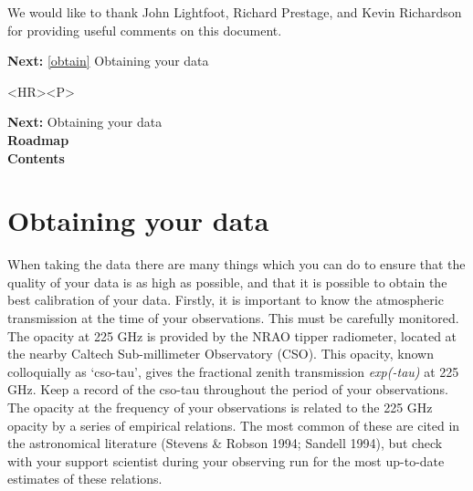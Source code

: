 \documentclass[11pt]{article}
\newenvironment{latexonly}{}{}
\newcommand{\htmlref}[2]{#1}
\newcommand{\xlabel}[1]{}
\begin{document}
   We would like to thank John Lightfoot, Richard Prestage, and Kevin
   Richardson for providing useful comments on this document.

\begin{latexonly}
{\bf Next:} \ref{obtain} Obtaining your data\\
\end{latexonly}

\begin{htmlonly}
\begin{rawhtml} <HR><P> \end{rawhtml}
{\bf \htmlref{Next:}{obtain}} Obtaining your data\\
{\bf \htmlref{Roadmap}{roadmap}}\\
{\bf \htmlref{Contents}{stardoccontents}}\\
\end{htmlonly}


\section{\label{obtain}\xlabel{obtain}Obtaining your data}

   When taking the data there are many things which you can do to ensure
   that the quality of your data is as high as possible, and that it is
   possible to obtain the best calibration of your data. Firstly, it is
   important to know the atmospheric transmission at the time of your
   observations. This must be carefully monitored. The opacity at
   225 GHz is provided by the NRAO tipper radiometer, located at the
   nearby Caltech Sub-millimeter Observatory (CSO). This opacity, known
   colloquially as `cso-tau',
   gives the fractional zenith transmission {\it exp(-tau)\/} at 225 GHz.
   Keep a record of the cso-tau throughout the period of your
   observations. The opacity at the frequency of your observations is
   related to the 225 GHz opacity by a series of empirical relations.
   The most common of these are cited in the astronomical literature
\htmlref{(Stevens \& Robson 1994;}{refer}
\htmlref{Sandell 1994),}{refer}
   but check with your support scientist during your observing run for
   the most up-to-date estimates of these relations.
\end{document}
